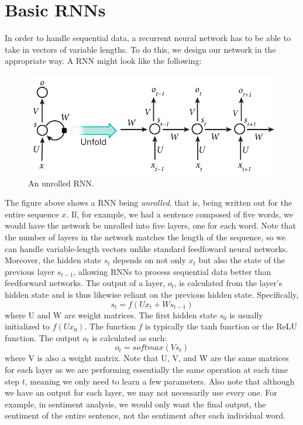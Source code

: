 \documentclass{article}
\begin{document}
\section{Basic RNNs}
    In order to handle sequential data, a recurrent neural network has to be able to take in vectors of variable lengths. To do this, we design our network in the appropriate way. A RNN might look like the following:
    \begin{figure}[H]
        \centerline{\includegraphics[scale=0.3]{rnn.jpg}}
        \caption{An unrolled RNN.}
        \label{fig:rnn}
    \end{figure}
    The figure above shows a RNN being \textit{unrolled}, that is, being written out for the entire sequence $x$. If, for example, we had a sentence composed of five words, we would have the network be unrolled into five layers, one for each word. Note that the number of layers in the network matches the length of the sequence, so we can handle variable-length vectors unlike standard feedfoward neural networks. Moreover, the hidden state $s_t$ depends on not only $x_t$ but also the state of the previous layer $s_{t-1}$, allowing RNNs to process sequential data better than feedforward networks. The output of a layer, $o_t$, is calculated from the layer's hidden state and is thus likewise reliant on the previous hidden state. Specifically, \[ s_t = f(Ux_t + Ws_{t-1})\] where U and W are weight matrices. The first hidden state $s_0$ is usually initialized to $f(Ux_0)$. The function $f$ is typically the tanh function or the ReLU function. The output $o_t$ is calculated as such: \[ o_t = softmax(Vs_t) \] where V is also a weight matrix. Note that U, V, and W are the same matrices for each layer as we are performing essentially the same operation at each time step $t$, meaning we only need to learn a few parameters. Also note that although we have an output for each layer, we may not necessarily use every one. For example, in sentiment analysis, we would only want the final output, the sentiment of the entire sentence, not the sentiment after each individual word.
    
\end{document}
